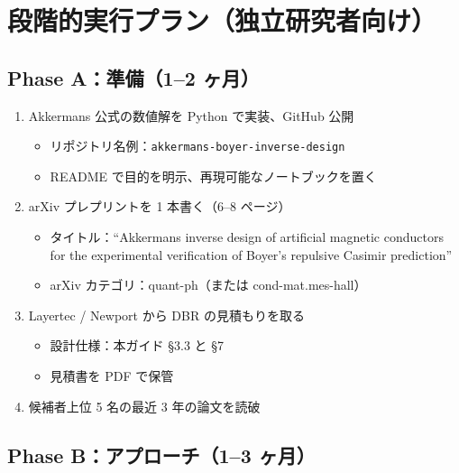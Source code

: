 \documentclass[11pt,a4paper]{article}
\begin{document}
\newpage

\section{段階的実行プラン（独立研究者向け）}

\subsection{Phase A：準備（1--2 ヶ月）}

\begin{enumerate}
\item Akkermans 公式の数値解を Python で実装、GitHub 公開
  \begin{itemize}
  \item リポジトリ名例：\texttt{akkermans-boyer-inverse-design}
  \item README で目的を明示、再現可能なノートブックを置く
  \end{itemize}
\item arXiv プレプリントを 1 本書く（6--8 ページ）
  \begin{itemize}
  \item タイトル：``Akkermans inverse design of artificial magnetic
    conductors for the experimental verification of Boyer's repulsive
    Casimir prediction''
  \item arXiv カテゴリ：quant-ph（または cond-mat.mes-hall）
  \end{itemize}
\item Layertec / Newport から DBR の見積もりを取る
  \begin{itemize}
  \item 設計仕様：本ガイド §3.3 と §7
  \item 見積書を PDF で保管
  \end{itemize}
\item 候補者上位 5 名の最近 3 年の論文を読破
\end{enumerate}

\subsection{Phase B：アプローチ（1--3 ヶ月）}
\end{document}

